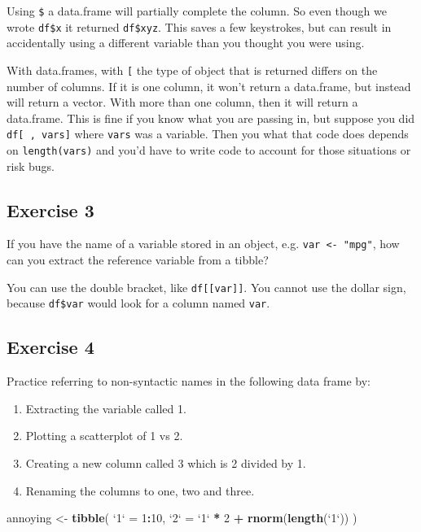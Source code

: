 \documentclass[]{book}
\newenvironment{Shaded}{\begin{snugshade}}{\end{snugshade}}
\newcommand{\DataTypeTok}[1]{\textcolor[rgb]{0.13,0.29,0.53}{#1}}
\newcommand{\DecValTok}[1]{\textcolor[rgb]{0.00,0.00,0.81}{#1}}
\newcommand{\KeywordTok}[1]{\textcolor[rgb]{0.13,0.29,0.53}{\textbf{#1}}}
\newcommand{\NormalTok}[1]{#1}
\newcommand{\OperatorTok}[1]{\textcolor[rgb]{0.81,0.36,0.00}{\textbf{#1}}}
\newcommand{\StringTok}[1]{\textcolor[rgb]{0.31,0.60,0.02}{#1}}
\providecommand{\tightlist}{%
  \setlength{\itemsep}{0pt}\setlength{\parskip}{0pt}}
\theoremstyle{plain}
\theoremstyle{remark}
\theoremstyle{definition}
\theoremstyle{definition}
\theoremstyle{definition}
\theoremstyle{remark}
\begin{document}
Using \texttt{\$} a data.frame will partially complete the column. So
even though we wrote \texttt{df\$x} it returned \texttt{df\$xyz}. This
saves a few keystrokes, but can result in accidentally using a different
variable than you thought you were using.

With data.frames, with \texttt{{[}} the type of object that is returned
differs on the number of columns. If it is one column, it won't return a
data.frame, but instead will return a vector. With more than one column,
then it will return a data.frame. This is fine if you know what you are
passing in, but suppose you did \texttt{df{[}\ ,\ vars{]}} where
\texttt{vars} was a variable. Then you what that code does depends on
\texttt{length(vars)} and you'd have to write code to account for those
situations or risk bugs.

\hypertarget{exercise-3-15}{%
\subsection{Exercise 3}\label{exercise-3-15}}

If you have the name of a variable stored in an object, e.g.
\texttt{var\ \textless{}-\ "mpg"}, how can you extract the reference
variable from a tibble?

You can use the double bracket, like \texttt{df{[}{[}var{]}{]}}. You
cannot use the dollar sign, because \texttt{df\$var} would look for a
column named \texttt{var}.

\hypertarget{exercise-4-12}{%
\subsection{Exercise 4}\label{exercise-4-12}}

Practice referring to non-syntactic names in the following data frame
by:

\begin{enumerate}
\def\labelenumi{\arabic{enumi}.}
\tightlist
\item
  Extracting the variable called 1.
\item
  Plotting a scatterplot of 1 vs 2.
\item
  Creating a new column called 3 which is 2 divided by 1.
\item
  Renaming the columns to one, two and three.
\end{enumerate}

\begin{Shaded}
\begin{Highlighting}[]
\NormalTok{annoying <-}\StringTok{ }\KeywordTok{tibble}\NormalTok{(}
  \StringTok{`}\DataTypeTok{1}\StringTok{`}\NormalTok{ =}\StringTok{ }\DecValTok{1}\OperatorTok{:}\DecValTok{10}\NormalTok{,}
  \StringTok{`}\DataTypeTok{2}\StringTok{`}\NormalTok{ =}\StringTok{ `}\DataTypeTok{1}\StringTok{`} \OperatorTok{*}\StringTok{ }\DecValTok{2} \OperatorTok{+}\StringTok{ }\KeywordTok{rnorm}\NormalTok{(}\KeywordTok{length}\NormalTok{(}\StringTok{`}\DataTypeTok{1}\StringTok{`}\NormalTok{))}
\NormalTok{)}
\end{Highlighting}
\end{Shaded}
\end{document}
